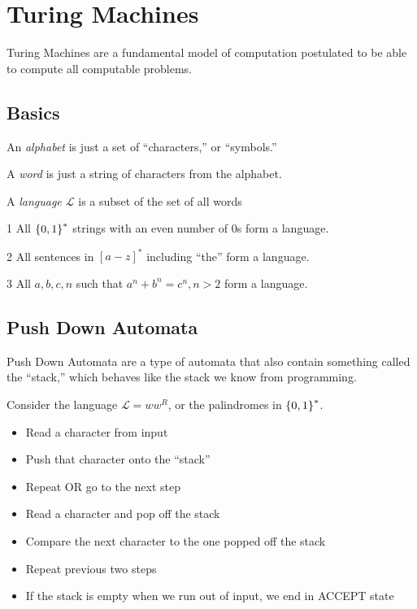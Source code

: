 \label{41-0521}
\section{Turing Machines}
Turing Machines are a fundamental model of computation postulated to be
able to compute all computable problems.

\subsection{Basics}
\begin{definition}
    An \emph{alphabet} is just a set of ``characters,'' or ``symbols.''
\end{definition}
\begin{definition}
    A \emph{word} is just a string of characters from the alphabet.
\end{definition}
\begin{definition}
    A \emph{language $\mathcal L$} is a subset of the set of all words
\end{definition}
\begin{example}1
    All $\left\{0, 1\right\}^*$ strings with an even number of 0s form a language.
\end{example}
\begin{example}2
    All sentences in $[a - z]^*$ including ``the'' form a language.
\end{example}
\begin{example}3
    All $a, b, c, n$ such that $a^n + b^n = c^n, n > 2$ form a language.
\end{example}

\subsection{Push Down Automata}
Push Down Automata are a type of automata that also contain something
called the ``stack,'' which behaves like the stack we know from programming.

Consider the language $\mathcal L = ww^R$, or the palindromes in $\left\{0, 1\right\}^*$.
\begin{itemize}
    \item Read a character from input
    \item Push that character onto the ``stack''
    \item Repeat OR go to the next step
    \item Read a character and pop off the stack
    \item Compare the next character to the one popped off the stack
    \item Repeat previous two steps
    \item If the stack is empty when we run out of input, we end in ACCEPT
    state
\end{itemize}

